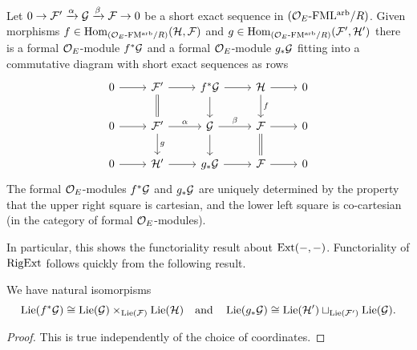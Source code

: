\documentclass[../main.tex]{subfiles}
\begin{document}
\begin{lem}\label{lem:CartesianSquare}
Let $0 \to \mathcal{F}' \xrightarrow{\alpha} \mathcal{G} \xrightarrow{\beta} \mathcal{F} \to 0$ be a short exact sequence in 
  ${({\mathcal{O}_E}\textnormal-\allowbreak\mathrm{FML^{arb}}/{R})}$. 
  Given morphisms $f \in \operatorname{Hom}_{{({\mathcal{O}_E}\textnormal-\allowbreak\mathrm{FM^{arb}}/{R})}}(\mathcal{H} , \mathcal{F})$ 
  and $g \in \operatorname{Hom}_{{({\mathcal{O}_E}\textnormal-\allowbreak\mathrm{FM^{arb}}/{R})}}(\mathcal{F}', \mathcal{H}')$ there is a formal
  ${\mathcal{O}_E}$-module $f^*\mathcal{G}$ and a formal $\mathcal{O}_E$-module $g_*\mathcal{G}$ fitting into a
  commutative diagram with short exact sequences as rows
  \begin{equation*}
    \begin{tikzcd}[ampersand replacement=\&]
    	0 \& {\cF'} \& {f^* \cG} \& \cH \& 0 \\
    	0 \& {\cF'} \& \cG \& \cF \& 0 \\
    	0 \& {\cH'} \& {g_*\cG} \& \cF \& 0
    	\arrow[from=1-1, to=1-2]
    	\arrow[from=1-2, to=1-3]
    	\arrow[Rightarrow, no head, from=1-2, to=2-2]
    	\arrow[from=1-3, to=1-4]
    	\arrow[from=1-3, to=2-3]
    	\arrow[from=1-4, to=1-5]
    	\arrow["f", from=1-4, to=2-4]
    	\arrow[from=2-1, to=2-2]
    	\arrow["\alpha", from=2-2, to=2-3]
    	\arrow["g", from=2-2, to=3-2]
    	\arrow["\beta", from=2-3, to=2-4]
    	\arrow[from=2-3, to=3-3]
    	\arrow[from=2-4, to=2-5]
    	\arrow[Rightarrow, no head, from=2-4, to=3-4]
    	\arrow[from=3-1, to=3-2]
    	\arrow[from=3-2, to=3-3]
    	\arrow[from=3-3, to=3-4]
    	\arrow[from=3-4, to=3-5]
    \end{tikzcd}
  \end{equation*}
  The formal $\mathcal{O}_E$-modules $f^* \mathcal{G}$ and $g_* \mathcal{G}$ are uniquely determined by the
  property that the upper right square is cartesian, and the lower left square is
  co-cartesian (in the category of formal $\mathcal{O}_E$-modules).
\end{lem}

In particular, this shows the functoriality result about $\operatorname{Ext}(-,-)$. 
Functoriality of $\operatorname {RigExt}$ follows quickly from the following result. 
\begin{lem}\label{lem:LieAlgebrasOfPBandPFW}
  We have natural isomorpisms 
  \begin{equation*}
    \operatorname{Lie}(f^* \mathcal{G}) \cong \operatorname{Lie}(\mathcal{G}) \times_{\operatorname{Lie}(\mathcal{F})} \operatorname{Lie}(\mathcal{H}) \quad \text{and}
    \quad \operatorname{Lie}(g_* \mathcal{G}) \cong \operatorname{Lie}(\mathcal{H}') \sqcup_{\operatorname{Lie}(\mathcal{F}')} \operatorname{Lie}(\mathcal{G}).
  \end{equation*}
\begin{proof}
  This is true independently of the choice of coordinates.
\end{proof}
\end{lem}
\end{document}
